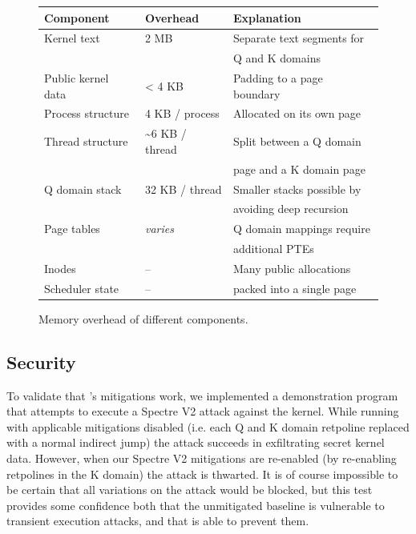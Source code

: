 \begin{figure}[t]
\small
\centering
\begin{tabular}{@{}lll@{}}
  {\bf Component} & {\bf Overhead} & {\bf Explanation} \\
  \midrule
  Kernel text & 2 MB & Separate text segments for \\ && \quad Q and K domains \\
  Public kernel data & < 4 KB & Padding to a page boundary \\
  Process structure & 4 KB / process & Allocated on its own page \\
  Thread structure & \textasciitilde 6 KB / thread & Split between a Q domain \\ && \quad page and a K domain page \\
  Q domain stack & 32 KB / thread & Smaller stacks possible by \\ && \quad avoiding deep recursion \\
  Page tables & \textit{varies} & Q domain mappings require \\ && \quad additional PTEs \\
  Inodes & -- & Many public allocations \\
  Scheduler state & -- & \quad packed into a single page \\
\end{tabular}
\caption{Memory overhead of different \sys components.}
\label{fig:memoverhead}
\end{figure}

\subsection*{Security}
\label{ss:secure}


To validate that \sys's mitigations work, we implemented a demonstration
program that attempts to execute a Spectre V2 attack against the \sys kernel.
While running with applicable mitigations disabled (i.e. each Q and K domain
retpoline replaced with a normal indirect jump) the attack succeeds in
exfiltrating secret kernel data. However, when our Spectre V2 mitigations are
re-enabled (by re-enabling retpolines in the K domain) the attack is thwarted.
It is of course impossible to be certain that all variations on the attack
would be blocked, but this test provides some confidence both that the unmitigated
baseline is vulnerable to transient execution attacks, and that \sys is able to prevent
them.


